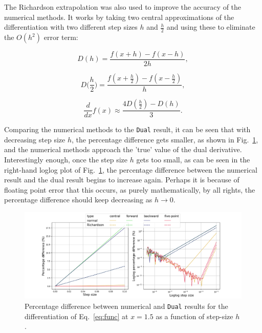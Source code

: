 \documentclass[11pt,a4paper]{article}
\begin{document}
The Richardson extrapolation \citep{1911RSPTA.210..307R} was also used to improve the accuracy of the numerical methods. It works by taking two central approximations of the differentiation with two different step sizes $h$ and $\frac{h}{2}$ and using these to eliminate the $O(h^2)$ error term:

\begin{equation}
    D(h) = \frac{f(x+h) - f(x-h)}{2h}, 
\end{equation}

\begin{equation}
    D\biggl(\frac{h}{2}\biggr) = \frac{f(x+\frac{h}{2}) - f(x-\frac{h}{2})}{h}, 
\end{equation}

\begin{equation}
    \frac{d}{dx} f(x) \approx \frac{4 D(\frac{h}{2}) - D(h)}{3}.
\end{equation}

Comparing the numerical methods to the \texttt{Dual} result, it can be seen that with decreasing step size $h$, the percentage difference gets smaller, as shown in Fig.~\ref{fig:pdiff}, and the numerical methods approach the 'true' value of the dual derivative. Interestingly enough, once the step size $h$ gets too small, as can be seen in the right-hand loglog plot of Fig.~\ref{fig:pdiff}, the percentage difference between the numerical result and the dual result begins to increase again. Perhaps it is because of floating point error that this occurs, as purely mathematically, by all rights, the percentage difference should keep decreasing as $h \to 0$.
\begin{landscape}
\begin{figure}
    \centering
    \includegraphics[width=\columnwidth, keepaspectratio]{../percentage_difference.png}
    \caption{Percentage difference between numerical and \texttt{Dual} results for the differentiation of Eq.~\ref{eq:func} at $x=1.5$ as a function of step-size $h$.}
    \label{fig:pdiff}
\end{figure}
\end{landscape}
\clearpage
\end{document}
